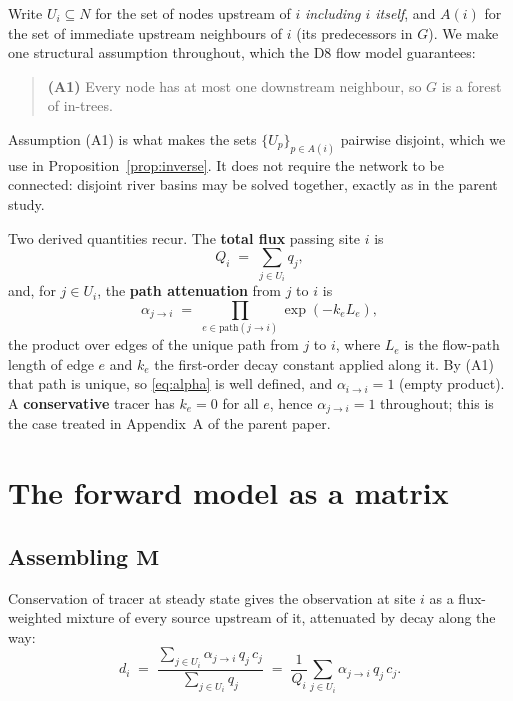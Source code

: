 \documentclass[11pt]{article}
\newcommand{\Mmat}{\ensuremath{\mathbf{M}}\xspace}
\theoremstyle{definition}
\begin{document}
\noindent Write $U_i \subseteq N$ for the set of nodes upstream of $i$ \textit{including $i$
itself}, and $A(i)$ for the set of immediate upstream neighbours of $i$ (its predecessors in
$G$). We make one structural assumption throughout, which the D8 flow model guarantees:

\begin{quote}
\textbf{(A1)} Every node has at most one downstream neighbour, so $G$ is a forest of
in-trees.
\end{quote}

\noindent Assumption (A1) is what makes the sets $\{U_p\}_{p \in A(i)}$ pairwise disjoint,
which we use in Proposition~\ref{prop:inverse}. It does not require the network to be
connected: disjoint river basins may be solved together, exactly as in the parent study.

Two derived quantities recur. The \textbf{total flux} passing site $i$ is
\begin{equation}
  Q_i \;=\; \sum_{j \in U_i} q_j ,
  \label{eq:Q}
\end{equation}
and, for $j \in U_i$, the \textbf{path attenuation} from $j$ to $i$ is
\begin{equation}
  \alpha_{j \to i} \;=\; \prod_{e \in \mathrm{path}(j \to i)} \exp\!\left( -k_{e} L_{e} \right),
  \label{eq:alpha}
\end{equation}
the product over edges of the unique path from $j$ to $i$, where $L_e$ is the flow-path length
of edge $e$ and $k_e$ the first-order decay constant applied along it. By (A1) that path is
unique, so \eqref{eq:alpha} is well defined, and $\alpha_{i \to i} = 1$ (empty product). A
\textbf{conservative} tracer has $k_e = 0$ for all $e$, hence $\alpha_{j \to i} = 1$
throughout; this is the case treated in Appendix~A of the parent paper.

\section{The forward model as a matrix}

\subsection{Assembling \texorpdfstring{$\Mmat$}{M}}

Conservation of tracer at steady state gives the observation at site $i$ as a flux-weighted
mixture of every source upstream of it, attenuated by decay along the way:
\begin{equation}
  d_i \;=\; \frac{\displaystyle\sum_{j \in U_i} \alpha_{j \to i}\, q_j\, c_j}
                 {\displaystyle\sum_{j \in U_i} q_j}
        \;=\; \frac{1}{Q_i} \sum_{j \in U_i} \alpha_{j \to i}\, q_j\, c_j .
  \label{eq:forward}
\end{equation}
\end{document}
